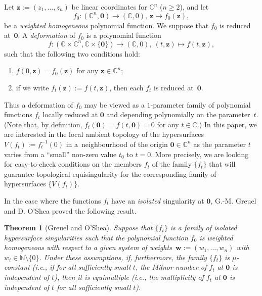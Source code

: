 \documentclass[a4paper,fleqn,11pt]{amsart}
\newtheorem{theorem}{Theorem}[section]
\theoremstyle{definition}
\theoremstyle{remark}
\numberwithin{equation}{section}
\begin{document}
Let $\mathbf{z}:=(z_1,\ldots,z_n)$ be linear coordinates for $\mathbb{C}^n$ ($n\geq 2$), and let 
\begin{equation*}
f_0\colon (\mathbb{C}^n,\mathbf{0})\rightarrow (\mathbb{C},0),\ 
\mathbf{z}\mapsto f_0(\mathbf{z}), 
\end{equation*}
be a \emph{weighted homogeneous} polynomial function. We suppose that $f_0$ is reduced at~$\mathbf{0}$. A \emph{deformation} of $f_0$ is a polynomial function 
\begin{equation*}
f\colon (\mathbb{C} \times \mathbb{C}^n,\mathbb{C} \times \{\mathbf{0}\}) \rightarrow (\mathbb{C},0),\ 
(t,\mathbf{z})\mapsto f(t,\mathbf{z}), 
\end{equation*}
such that the following two conditions hold:
\begin{enumerate}
\item
$f(0,\mathbf{z})=f_0(\mathbf{z})$ for any $\mathbf{z}\in\mathbb{C}^n$; 
\item
if we write $f_t(\mathbf{z}):= f(t,\mathbf{z})$, then each $f_t$ is reduced at~$\mathbf{0}$.
\end{enumerate}
Thus a deformation of $f_0$ may be viewed as a $1$-parameter family of polynomial functions $f_t$ locally reduced at $\mathbf{0}$ and depending polynomially on the parameter~$t$. (Note that, by definition, $f_t(\mathbf{0}) = f(t,\mathbf{0})=0$ for any $t\in\mathbb{C}$.) In this paper, we are interested in the local ambient topology of the hypersurfaces $V(f_t):=f_t^{-1}(0)$ in a~neighbourhood of the origin $\mathbf{0}\in \mathbb{C}^n$ as the parameter $t$ varies from a ``small'' non-zero  value $t_0$ to $t=0$. More precisely, we are looking for easy-to-check conditions on the members $f_t$ of the family $\{f_t\}$ that will guarantee topological equisingularity for the corresponding family of hypersurfaces $\{V(f_t)\}$.

In the case where the functions $f_t$ have an \emph{isolated} singularity at $\mathbf{0}$, G.-M. Greuel \cite{G} and D. O'Shea \cite{O'Sh} proved the following result.

\begin{theorem}[Greuel and O'Shea]\label{thm-GOSh}
Suppose that $\{f_t\}$ is a family of isolated hypersurface singularities such that the polynomial function $f_0$ is weighted homogeneous with respect to a given system of weights~$\mathbf{w}:=(w_1,\ldots,w_n)$ with $w_i\in \mathbb{N}\setminus\{0\}$. Under these assumptions, if, furthermore, the family $\{f_t\}$ is $\mu$-constant  (i.e., if for all sufficiently small $t$, the Milnor number of $f_t$ at $\mathbf{0}$ is independent of $t$), then it is equimultiple (i.e., the multiplicity of $f_t$ at $\mathbf{0}$ is independent of $t$ for all sufficiently small $t$).
\end{theorem}
\end{document}
